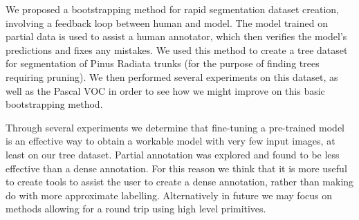 We proposed a bootstrapping method for rapid segmentation dataset creation, involving a feedback loop between human and model. The model trained on partial data is used to assist a human annotator, which then verifies the model's predictions and fixes any mistakes. We used this method to create a tree dataset for segmentation of Pinus Radiata trunks (for the purpose of finding trees requiring pruning). We then performed several experiments on this dataset, as well as the Pascal VOC in order to see how we might improve on this basic bootstrapping method. 

Through several experiments we determine that fine-tuning a pre-trained model is an effective way to obtain a workable model with very few input images, at least on our tree dataset. Partial annotation was explored and found to be less effective than a dense annotation. For this reason we think that it is more useful to create tools to assist the user to create a dense annotation, rather than making do with more approximate labelling. Alternatively in future we may focus on methods allowing for a round trip using high level primitives.



